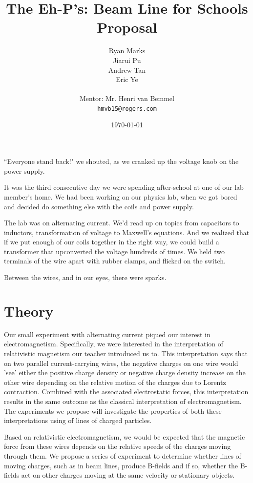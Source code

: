 \documentclass[12pt,letterpaper]{article}
\begin{document}
\title{The Eh-P's: Beam Line for Schools Proposal}
\author{
Ryan Marks\\
Jiarui Pu \\ 
Andrew Tan\\
Eric Ye\\
\\
Mentor: Mr. Henri van Bemmel\\
\normalsize{\texttt{hmvb15@rogers.com}}
}

\date{\today}
\maketitle

``Everyone stand back!" we shouted, as we cranked up the voltage knob on the power supply.

It was the third consecutive day we were spending after-school at one of our lab member’s home. We had been working on our physics lab, when we got bored and decided do something else with the coils and power supply.

The lab was on alternating current. We’d read up on topics from capacitors to inductors, transformation of voltage to Maxwell's equations.
And we realized that if we put enough of our coils together in the right way, we could build a transformer that upconverted the voltage hundreds of times. We held two terminals of the wire apart with rubber clamps, and flicked on the switch.

Between the wires, and in our eyes, there were sparks.
\section{Theory}
Our small experiment with alternating current piqued our interest in electromagnetism. Specifically, we were interested in the interpretation of relativistic magnetism our teacher introduced us to. 
This interpretation says that on two parallel current-carrying wires, the negative charges on one wire would 'see' either the positive charge density or negative charge density increase on the other wire depending on the relative motion of the charges due to Lorentz contraction.
Combined with the associated electrostatic forces, this interpretation results in the same outcome as the classical interpretation of electromagnetism.
The experiments we propose will investigate the properties of both these interpretations using of lines of charged particles.

Based on relativistic electromagnetism, we would be expected that the magnetic force from these wires depends on the relative speeds of the charges moving through them.
We propose a series of experiment to determine whether lines of moving charges, such as in beam lines, produce B-fields and if so, whether the B-fields act on other charges moving at the same velocity or stationary objects.
\end{document}
